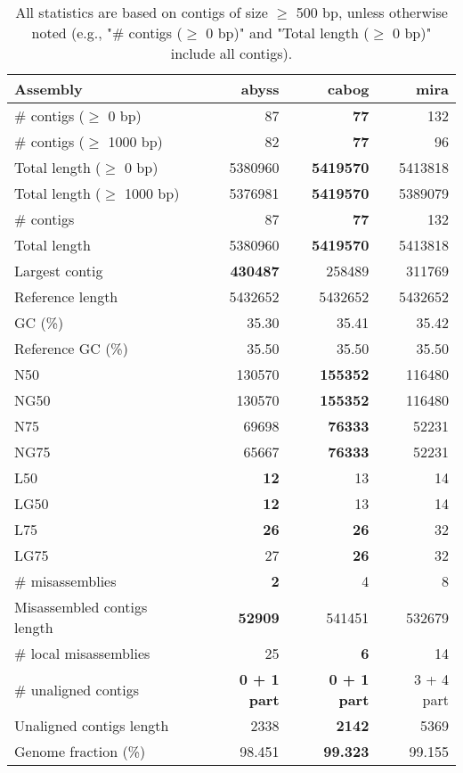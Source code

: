 \documentclass[12pt,a4paper]{article}
\begin{document}
\begin{table}[ht]
\begin{center}
\caption{All statistics are based on contigs of size $\geq$ 500 bp, unless otherwise noted (e.g., "\# contigs ($\geq$ 0 bp)" and "Total length ($\geq$ 0 bp)" include all contigs).}
\begin{tabular}{|l*{3}{|r}|}
\hline
Assembly & abyss & cabog & mira \\ \hline
\# contigs ($\geq$ 0 bp) & 87 & {\bf 77} & 132 \\ \hline
\# contigs ($\geq$ 1000 bp) & 82 & {\bf 77} & 96 \\ \hline
Total length ($\geq$ 0 bp) & 5380960 & {\bf 5419570} & 5413818 \\ \hline
Total length ($\geq$ 1000 bp) & 5376981 & {\bf 5419570} & 5389079 \\ \hline
\# contigs & 87 & {\bf 77} & 132 \\ \hline
Total length & 5380960 & {\bf 5419570} & 5413818 \\ \hline
Largest contig & {\bf 430487} & 258489 & 311769 \\ \hline
Reference length & 5432652 & 5432652 & 5432652 \\ \hline
GC (\%) & 35.30 & 35.41 & 35.42 \\ \hline
Reference GC (\%) & 35.50 & 35.50 & 35.50 \\ \hline
N50 & 130570 & {\bf 155352} & 116480 \\ \hline
NG50 & 130570 & {\bf 155352} & 116480 \\ \hline
N75 & 69698 & {\bf 76333} & 52231 \\ \hline
NG75 & 65667 & {\bf 76333} & 52231 \\ \hline
L50 & {\bf 12} & 13 & 14 \\ \hline
LG50 & {\bf 12} & 13 & 14 \\ \hline
L75 & {\bf 26} & {\bf 26} & 32 \\ \hline
LG75 & 27 & {\bf 26} & 32 \\ \hline
\# misassemblies & {\bf 2} & 4 & 8 \\ \hline
Misassembled contigs length & {\bf 52909} & 541451 & 532679 \\ \hline
\# local misassemblies & 25 & {\bf 6} & 14 \\ \hline
\# unaligned contigs & {\bf 0 + 1 part} & {\bf 0 + 1 part} & 3 + 4 part \\ \hline
Unaligned contigs length & 2338 & {\bf 2142} & 5369 \\ \hline
Genome fraction (\%) & 98.451 & {\bf 99.323} & 99.155 \\ \hline

\end{tabular}
\end{center}
\end{table}
\end{document}
